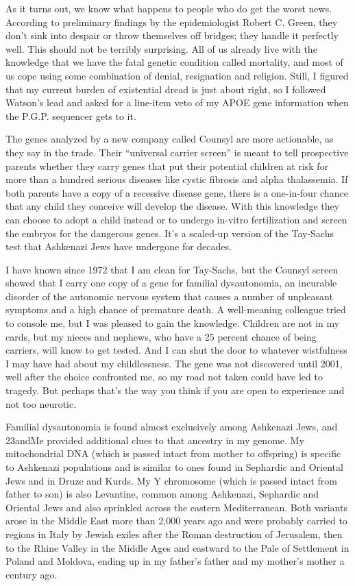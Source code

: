As it turns out, we know what happens to people who do get the worst
news. According to preliminary findings by the epidemiologist Robert C.
Green, they don't sink into despair or throw themselves off bridges;
they handle it perfectly well. This should not be terribly surprising.
All of us already live with the knowledge that we have the fatal genetic
condition called mortality, and most of us cope using some combination
of denial, resignation and religion. Still, I figured that my current
burden of existential dread is just about right, so I followed Watson's
lead and asked for a line-item veto of my APOE gene information when the
P.G.P. sequencer gets to it.

The genes analyzed by a new company called Counsyl are more actionable,
as they say in the trade. Their ``universal carrier screen'' is meant to
tell prospective parents whether they carry genes that put their
potential children at risk for more than a hundred serious diseases like
cystic fibrosis and alpha thalassemia. If both parents have a copy of a
recessive disease gene, there is a one-in-four chance that any child
they conceive will develop the disease. With this knowledge they can
choose to adopt a child instead or to undergo in-vitro fertilization and
screen the embryos for the dangerous genes. It's a scaled-up version of
the Tay-Sachs test that Ashkenazi Jews have undergone for decades.

I have known since 1972 that I am clean for Tay-Sachs, but the Counsyl
screen showed that I carry one copy of a gene for familial dysautonomia,
an incurable disorder of the autonomic nervous system that causes a
number of unpleasant symptoms and a high chance of premature death. A
well-meaning colleague tried to console me, but I was pleased to gain
the knowledge. Children are not in my cards, but my nieces and nephews,
who have a 25 percent chance of being carriers, will know to get tested.
And I can shut the door to whatever wistfulness I may have had about my
childlessness. The gene was not discovered until 2001, well after the
choice confronted me, so my road not taken could have led to tragedy.
But perhaps that's the way you think if you are open to experience and
not too neurotic.

Familial dysautonomia is found almost exclusively among Ashkenazi Jews,
and 23andMe provided additional clues to that ancestry in my genome. My
mitochondrial DNA (which is passed intact from mother to offspring) is
specific to Ashkenazi populations and is similar to ones found in
Sephardic and Oriental Jews and in Druze and Kurds. My Y chromosome
(which is passed intact from father to son) is also Levantine, common
among Ashkenazi, Sephardic and Oriental Jews and also sprinkled across
the eastern Mediterranean. Both variants arose in the Middle East more
than 2,000 years ago and were probably carried to regions in Italy by
Jewish exiles after the Roman destruction of Jerusalem, then to the
Rhine Valley in the Middle Ages and eastward to the Pale of Settlement
in Poland and Moldova, ending up in my father's father and my mother's
mother a century ago.

